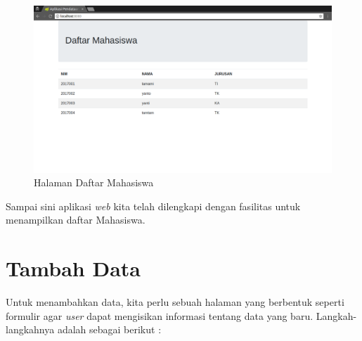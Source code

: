 \begin{enumerate}
	\begin{figure}[H]
		\centering
		\includegraphics[width=1\textwidth]{./resources/034-halaman-daftar-mahasiswa}
		\caption{Halaman Daftar Mahasiswa}
		\label{fig:halaman-daftar-mahasiswa}
	\end{figure}
\end{enumerate}

Sampai sini aplikasi \textit{web} kita telah dilengkapi dengan fasilitas untuk menampilkan daftar Mahasiswa.


\section{Tambah Data}

Untuk menambahkan data, kita perlu sebuah halaman yang berbentuk seperti formulir agar \textit{user} dapat mengisikan informasi tentang data yang baru. Langkah-langkahnya adalah sebagai berikut :

